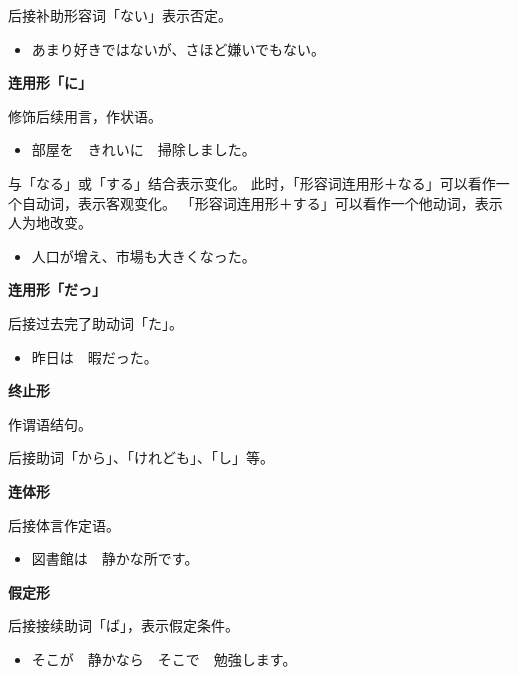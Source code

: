 后接补助形容词「ない」表示否定。
\begin{itemize}
  \item あまり好きではないが、さほど嫌いでもない。
\end{itemize}

{\bf
\noindent 连用形「に」
}

修饰后续用言，作状语。
\begin{itemize}
  \item 部屋を　きれいに　掃除しました。
\end{itemize}

与「なる」或「する」结合表示变化。
此时，「形容词连用形＋なる」可以看作一个自动词，表示客观变化。
「形容词连用形＋する」可以看作一个他动词，表示人为地改变。
\begin{itemize}
  \item 人口が增え、市場も大きくなった。
\end{itemize}

{\bf
\noindent 连用形「だっ」
}

后接过去完了助动词「た」。
\begin{itemize}
  \item 昨日は　暇だった。
\end{itemize}

{\bf
\noindent 终止形
}

作谓语结句。

后接助词「から」、「けれども」、「し」等。

{\bf
\noindent 连体形
}

后接体言作定语。
\begin{itemize}
  \item 図書館は　静かな所です。
\end{itemize}

{\bf
\noindent 假定形
}

后接接续助词「ば」，表示假定条件。
\begin{itemize}
  \item そこが　静かなら　そこで　勉強します。
\end{itemize}

